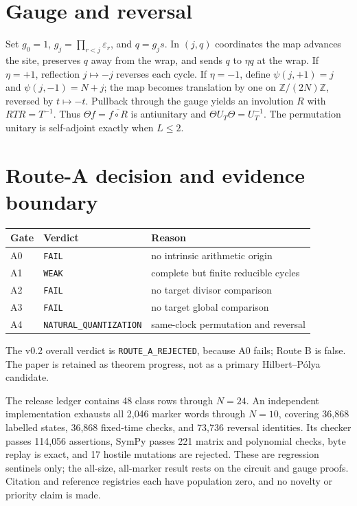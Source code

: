 \documentclass[10pt]{article}
\begin{document}
\section{Gauge and reversal}
Set $g_0=1$, $g_j=\prod_{r<j}\varepsilon_r$, and $q=g_js$.  In $(j,q)$
coordinates the map advances the site, preserves $q$ away from the wrap, and
sends $q$ to $\eta q$ at the wrap.  If $\eta=+1$, reflection $j\mapsto-j$
reverses each cycle.  If $\eta=-1$, define
$\psi(j,+1)=j$ and $\psi(j,-1)=N+j$; the map becomes translation by one on
$\mathbb Z/(2N)\mathbb Z$, reversed by $t\mapsto-t$.  Pullback through the
gauge yields an involution $R$ with $RTR=T^{-1}$.  Thus
$\Theta f=\overline{f\circ R}$ is antiunitary and
$\Theta U_T\Theta=U_T^{-1}$.  The permutation unitary is self-adjoint exactly
when $L\le2$.
\section{Route-A decision and evidence boundary}
\begin{center}
\small
\begin{tabular}{lll}
\toprule
Gate&Verdict&Reason\\
\midrule
A0&\texttt{FAIL}&no intrinsic arithmetic origin\\
A1&\texttt{WEAK}&complete but finite reducible cycles\\
A2&\texttt{FAIL}&no target divisor comparison\\
A3&\texttt{FAIL}&no target global comparison\\
A4&\texttt{NATURAL\_QUANTIZATION}&same-clock permutation and reversal\\
\bottomrule
\end{tabular}
\end{center}
The v0.2 overall verdict is \texttt{ROUTE\_A\_REJECTED}, because A0 fails;
Route B is false.  The paper is retained as theorem progress, not as a primary
Hilbert--P\'olya candidate.

The release ledger contains 48 class rows through $N=24$.  An independent
implementation exhausts all 2{,}046 marker words through $N=10$, covering
36{,}868 labelled states, 36{,}868 fixed-time checks, and 73{,}736 reversal
identities.  Its checker passes 114{,}056 assertions, SymPy passes 221 matrix
and polynomial checks, byte replay is exact, and 17 hostile mutations are
rejected.  These are regression sentinels only; the all-size, all-marker
result rests on the circuit and gauge proofs.  Citation and reference
registries each have population zero, and no novelty or priority claim is
made.
\end{document}
